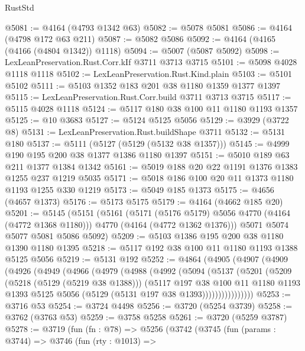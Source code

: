 \begin{lexlean}{RustStd}
\begin{coremodule}
@5081 := @4164 (@4793 @1342 @63)
@5082 := @5078 @5081
@5086 := @4164 (@4798 @172 @63 @211)
@5087 := @5082 @5086
@5092 := @4164 (@4165 (@4166 (@4804 @1342)) @1118)
@5094 := @5007 (@5087 @5092)
@5098 := LexLeanPreservation.Rust.Corr.kIf @3711 @3713 @3715
@5101 := @5098 @4028 @1118 @1118
@5102 := LexLeanPreservation.Rust.Kind.plain
@5103 := @5101 @5102
@5111 := @5103 @1352 @183 @201 @38 @1180 @1359 @1377 @1397
@5115 := LexLeanPreservation.Rust.Corr.build @3711 @3713 @3715
@5117 := @5115 @4028 @1118
@5124 := @5117 @180 @38 @100 @11 @1180 @1193 @1357
@5125 := @10 @3683
@5127 := @5124 @5125 @5056
@5129 := @3929 (@3722 @8)
@5131 := LexLeanPreservation.Rust.buildShape @3711
@5132 := @5131 @180
@5137 := @5111 (@5127 (@5129 (@5132 @38 @1357)))
@5145 := @4999 @190 @195 @200 @38 @1377 @1386 @1180 @1397
@5151 := @5010 @189 @63 @211 @1377 @1384 @1342
@5161 := @5019 @188 @20 @22 @1191 @1376 @1383 @1255 @237 @1219 @5035
@5171 := @5018 @186 @100 @20 @11 @1373 @1180 @1193 @1255 @330 @1219
@5173 := @5049 @185 @1373
@5175 := @4656 (@4657 @1373)
@5176 := @5173 @5175
@5179 := @4164 (@4662 @185 @20)
@5201 := @5145
    (@5151
      (@5161
        (@5171 (@5176 @5179) @5056 @4770 (@4164 (@4772 @1368 @1180)))
        @4770
        (@4164 (@4772 @1362 @1376)))
      @5071
      @5074
      @5077
      @5081
      @5086
      @5092)
@5209 := @5103 @1386 @195 @200 @38 @1180 @1390 @1180 @1395
@5218 := @5117 @192 @38 @100 @11 @1180 @1193 @1388 @5125 @5056
@5219 := @5131 @192
@5252 := @4864
    (@4905
      (@4907
        (@4909
          (@4926
            (@4949
              (@4966
                (@4979
                  (@4988
                    (@4992
                      (@5094
                        (@5137
                          (@5201
                            (@5209
                              (@5218 (@5129 (@5219 @38 @1388)))
                              (@5117
                                @197
                                @38
                                @100
                                @11
                                @1180
                                @1193
                                @1393
                                @5125
                                @5056
                                (@5129 (@5131 @197 @38 @1393))))))))))))))))
@5253 := @3716 @53
@5254 := @3724 @4498
@5256 := @3720 (@5254 @3739)
@5258 := @3762 (@3763 @53)
@5259 := @3758 @5258
@5261 := @3720 (@5259 @3787)
@5278 := @3719
    (fun (fn : @78) =>
    @5256
      (@3742
        (@3745
          (fun (params : @3744) =>
          @3746
            (fun (rty : @1013) =>

\end{coremodule}
\end{lexlean}
